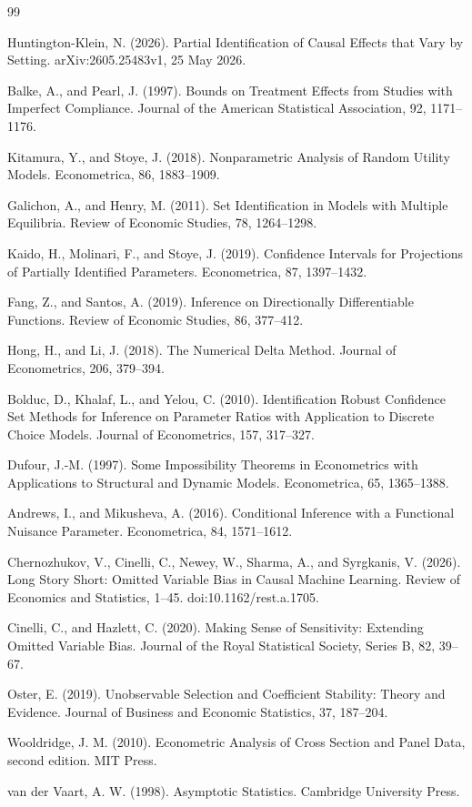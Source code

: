 \documentclass{article}
\begin{document}
\begin{thebibliography}{99}

   Huntington-Klein, N. (2026). Partial Identification of Causal Effects that Vary by Setting. arXiv:2605.25483v1, 25 May 2026.

   Balke, A., and Pearl, J. (1997). Bounds on Treatment Effects from Studies with Imperfect Compliance. Journal of the American Statistical Association, 92, 1171--1176.

   Kitamura, Y., and Stoye, J. (2018). Nonparametric Analysis of Random Utility Models. Econometrica, 86, 1883--1909.

   Galichon, A., and Henry, M. (2011). Set Identification in Models with Multiple Equilibria. Review of Economic Studies, 78, 1264--1298.

   Kaido, H., Molinari, F., and Stoye, J. (2019). Confidence Intervals for Projections of Partially Identified Parameters. Econometrica, 87, 1397--1432.

   Fang, Z., and Santos, A. (2019). Inference on Directionally Differentiable Functions. Review of Economic Studies, 86, 377--412.

   Hong, H., and Li, J. (2018). The Numerical Delta Method. Journal of Econometrics, 206, 379--394.

   Bolduc, D., Khalaf, L., and Yelou, C. (2010). Identification Robust Confidence Set Methods for Inference on Parameter Ratios with Application to Discrete Choice Models. Journal of Econometrics, 157, 317--327.

   Dufour, J.-M. (1997). Some Impossibility Theorems in Econometrics with Applications to Structural and Dynamic Models. Econometrica, 65, 1365--1388.

   Andrews, I., and Mikusheva, A. (2016). Conditional Inference with a Functional Nuisance Parameter. Econometrica, 84, 1571--1612.

   Chernozhukov, V., Cinelli, C., Newey, W., Sharma, A., and Syrgkanis, V. (2026). Long Story Short: Omitted Variable Bias in Causal Machine Learning. Review of Economics and Statistics, 1--45. doi:10.1162/rest.a.1705.

   Cinelli, C., and Hazlett, C. (2020). Making Sense of Sensitivity: Extending Omitted Variable Bias. Journal of the Royal Statistical Society, Series B, 82, 39--67.

   Oster, E. (2019). Unobservable Selection and Coefficient Stability: Theory and Evidence. Journal of Business and Economic Statistics, 37, 187--204.

   Wooldridge, J. M. (2010). Econometric Analysis of Cross Section and Panel Data, second edition. MIT Press.

   van der Vaart, A. W. (1998). Asymptotic Statistics. Cambridge University Press.

\end{thebibliography}
\end{document}
